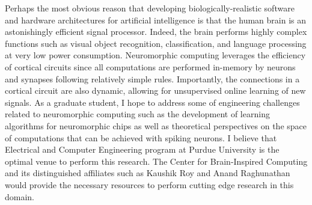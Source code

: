 \documentclass{article}
\begin{document}
\indent Perhaps the most obvious reason that developing biologically-realistic software and hardware architectures for artificial intelligence is that the human brain is an astonishingly efficient signal processor. Indeed, the brain performs highly complex functions such as visual object recognition, classification, and language processing at very low power consumption. Neuromorphic computing leverages the efficiency of cortical circuits since all computations are performed in-memory by neurons and synapses following relatively simple rules. Importantly, the connections in a cortical circuit are also dynamic, allowing for unsupervised online learning of new signals. As a graduate student, I hope to address some of engineering challenges related to neuromorphic computing such as the development of learning algorithms for neuromorphic chips as well as theoretical perspectives on the space of computations that can be achieved with spiking neurons. I believe that Electrical and Computer Engineering program at Purdue University is the optimal venue to perform this research. The Center for Brain-Inspired Computing and its distinguished affiliates such as Kaushik Roy and Anand Raghunathan would provide the necessary resources to perform cutting edge research in this domain.\\
\end{document}
